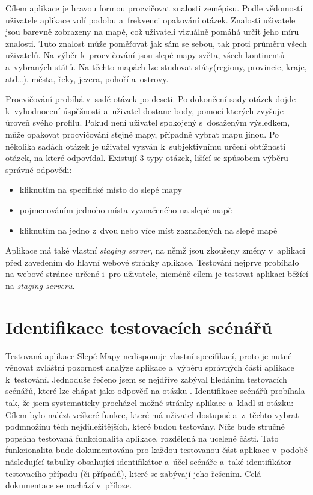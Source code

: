 \documentclass[
    color,   %
	table,   %
    twoside, %
    nolot, nolof,
]{fithesis3}
\begin{document}
Cílem aplikace je hravou formou procvičovat znalosti zeměpisu. Podle vědomostí uživatele aplikace volí podobu a~frekvenci opakování otázek. Znalosti uživatele jsou barevně zobrazeny na mapě, což uživateli vizuálně pomáhá určit jeho míru znalosti. Tuto znalost může poměřovat jak sám se sebou, tak proti průměru všech uživatelů. Na výběr k~procvičování jsou slepé mapy světa, všech kontinentů a~vybraných států. Na těchto mapách lze studovat státy(regiony, provincie, kraje, atd\ldots), města, řeky, jezera, pohoří a~ostrovy.

Procvičování probíhá v~sadě otázek po deseti. Po dokončení sady otázek dojde k~vyhodnocení úspěšnosti a~uživatel dostane body, pomocí kterých zvyšuje úroveň svého profilu. Pokud není uživatel spokojený s~dosaženým výsledkem, může opakovat procvičování stejné mapy, případně vybrat mapu jinou. Po několika sadách otázek je uživatel vyzván k~subjektivnímu určení obtížnosti otázek, na které odpovídal. Existují 3 typy otázek, lišící se způsobem výběru správné odpovědi:

\begin{itemize}
\item kliknutím na specifické místo do slepé mapy
\item pojmenováním jednoho místa vyznačeného na slepé mapě
\item kliknutím na jedno z~dvou nebo více míst zaznačených na slepé mapě
\end{itemize}

Aplikace má také vlastní \emph{staging server}, na němž jsou zkoušeny změny v~aplikaci před zavedením do hlavní webové stránky aplikace. Testování nejprve probíhalo na webové stránce určené i~pro uživatele, nicméně cílem je testovat aplikaci běžící na \emph{staging serveru}.

\section{Identifikace testovacích scénářů}
Testovaná aplikace Slepé Mapy nedisponuje vlastní specifikací, proto je nutné věnovat zvláštní pozornost analýze aplikace a~výběru správných částí aplikace k~testování. Jednoduše řečeno jsem se nejdříve zabýval hledáním testovacích scénářů, které lze chápat jako odpověď na otázku . Identifikace scénářů probíhala tak, že jsem systematicky procházel možné stránky aplikace a~kladl si otázku:  Cílem bylo nalézt veškeré funkce, které má uživatel dostupné a~z~těchto vybrat podmnožinu těch nejdůležitějších, které budou testovány. Níže bude stručně popsána testovaná funkcionalita aplikace, rozdělená na ucelené části. Tato funkcionalita bude dokumentována pro každou testovanou část aplikace v~podobě následující tabulky obsahující identifikátor a~účel scénáře a~také identifikátor testovacího případu (či případů), které se zabývají jeho řešením. Celá dokumentace se nachází v~příloze.
\end{document}
